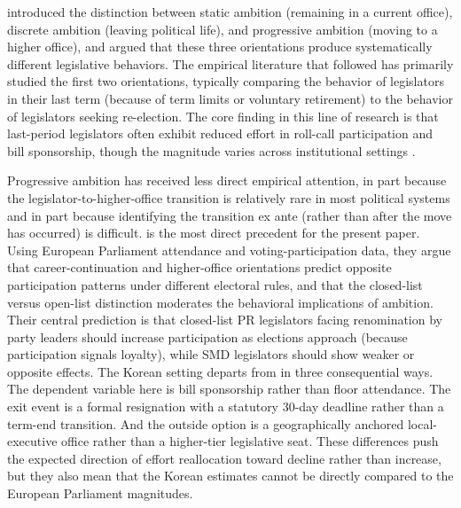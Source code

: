 \documentclass[11pt]{article}
\begin{document}
\citet{schlesinger1966} introduced the distinction between static ambition (remaining in a current office), discrete ambition (leaving political life), and progressive ambition (moving to a higher office), and argued that these three orientations produce systematically different legislative behaviors. The empirical literature that followed has primarily studied the first two orientations, typically comparing the behavior of legislators in their last term (because of term limits or voluntary retirement) to the behavior of legislators seeking re-election. The core finding in this line of research is that last-period legislators often exhibit reduced effort in roll-call participation and bill sponsorship, though the magnitude varies across institutional settings \citep{besleycase1995, titiunikfeher2017, mixontorgler2023}.

Progressive ambition has received less direct empirical attention, in part because the legislator-to-higher-office transition is relatively rare in most political systems and in part because identifying the transition ex ante (rather than after the move has occurred) is difficult. \citet{hoyland2017} is the most direct precedent for the present paper. Using European Parliament attendance and voting-participation data, they argue that career-continuation and higher-office orientations predict opposite participation patterns under different electoral rules, and that the closed-list versus open-list distinction moderates the behavioral implications of ambition. Their central prediction is that closed-list PR legislators facing renomination by party leaders should increase participation as elections approach (because participation signals loyalty), while SMD legislators should show weaker or opposite effects. The Korean setting departs from \citet{hoyland2017} in three consequential ways. The dependent variable here is bill sponsorship rather than floor attendance. The exit event is a formal resignation with a statutory 30-day deadline rather than a term-end transition. And the outside option is a geographically anchored local-executive office rather than a higher-tier legislative seat. These differences push the expected direction of effort reallocation toward decline rather than increase, but they also mean that the Korean estimates cannot be directly compared to the European Parliament magnitudes.
\end{document}
